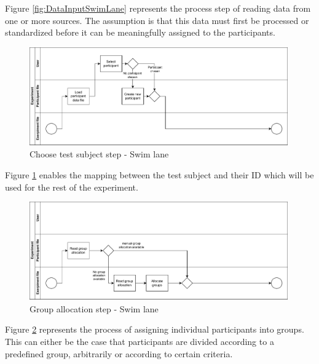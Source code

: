 Figure \ref{fig:DataInputSwimLane} represents the process step of reading data from one or more sources. The assumption is that this data must first be processed or standardized before it can be meaningfully assigned to the participants.

\begin{figure}[htbp]
    \centering
    \includegraphics[width=0.99\textwidth, keepaspectratio]{content/05_design_and_dev_artefacts/ChooseTestSubjectSwimLane.drawio.pdf}
    \caption{Choose test subject step - Swim lane}    
    \label{fig:ChooseTestSubjectSwimLane}
\end{figure}

Figure \ref{fig:ChooseTestSubjectSwimLane} enables the mapping between the test subject and their ID which will be used for the rest of the experiment.

\begin{figure}[htbp]
    \centering
    \includegraphics[width=0.99\textwidth, keepaspectratio]{content/05_design_and_dev_artefacts/GroupAllocationSwimLane.drawio.pdf}
    \caption{Group allocation step - Swim lane}    
    \label{fig:groupAllocationSwimLane}
\end{figure}

Figure \ref{fig:groupAllocationSwimLane} represents the process of assigning individual participants into groups. This can either be the case that participants are divided according to a predefined group, arbitrarily or according to certain criteria.

